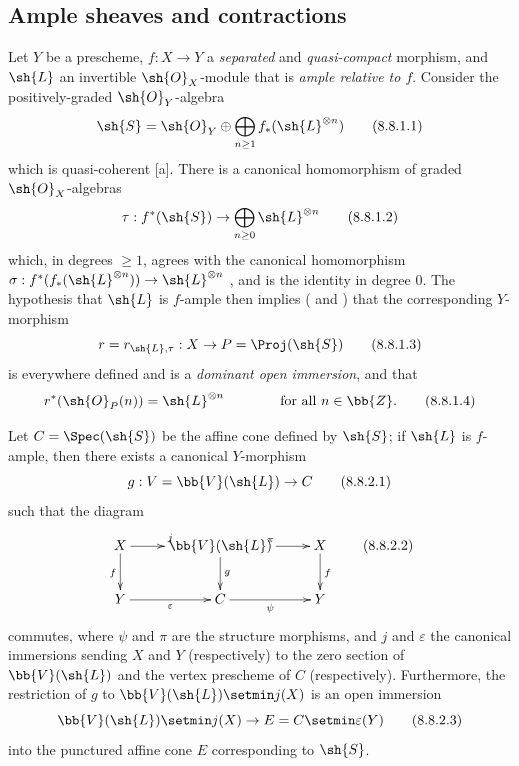 \subsection{Ample sheaves and contractions}
\label{subsection:II.8.8}

\begin{env}[8.8.1]
\label{II.8.8.1}
Let $Y$ be a prescheme, $f:X\to Y$ a \emph{separated} and \emph{quasi-compact} morphism, and $\sh{L}$ an invertible $\sh{O}_X$-module that is \emph{ample relative to $f$}.
Consider the positively-graded $\sh{O}_Y$-algebra
\[
\label{II.8.8.1.1}
  \sh{S} = \sh{O}_Y \oplus \bigoplus_{n\geq1}f_*(\sh{L}^{\otimes n})
\tag{8.8.1.1}
\]
which is quasi-coherent [a].
There is a canonical homomorphism of graded $\sh{O}_X$-algebras
\[
\label{II.8.8.1.2}
  \tau: f^*(\sh{S}) \to \bigoplus_{n\geq0}\sh{L}^{\otimes n}
\tag{8.8.1.2}
\]
which, in degrees $\geq1$, agrees with the canonical homomorphism $\sigma:f^*(f_*(\sh{L}^{\otimes n})) \to \sh{L}^{\otimes n}$ , and is the identity in degree 0.
The hypothesis that $\sh{L}$ is $f$-ample then implies ( and ) that the corresponding $Y$-morphism
\[
\label{II.8.8.1.3}
  r = r_{\sh{L},\tau} : X \to P = \Proj(\sh{S})
\tag{8.8.1.3}
\]
is everywhere defined and is a \emph{dominant open immersion}, and that
\[
\label{II.8.8.1.4}
  r^*(\sh{O}_P(n)) = \sh{L}^{\otimes n}
  \qquad\qquad
  \mbox{for all $n\in\bb{Z}$.}
\tag{8.8.1.4}
\]
\end{env}

\begin{proposition}[8.8.2]
\label{II.8.8.2}
Let $C=\Spec(\sh{S})$ be the affine cone defined by $\sh{S}$;
if $\sh{L}$ is $f$-ample, then there exists a canonical $Y$-morphism
\[
\label{II.8.8.2.1}
  g : V = \bb{V}(\sh{L}) \to C
\tag{8.8.2.1}
\]
such that the diagram
\[
\label{II.8.8.2.2}
  \xymatrix{
    X
      \ar[r]^{j}
      \ar[d]_{f}
  & \bb{V}(\sh{L})
      \ar[r]^{\pi}
      \ar[d]^{g}
  & X
      \ar[d]^{f}
  \\Y
      \ar[r]_{\varepsilon}
  & C
      \ar[r]_{\psi}
  & Y
  }
  \tag{8.8.2.2}
\]
commutes, where $\psi$ and $\pi$ are the structure morphisms, and $j$ and $\varepsilon$ the canonical immersions sending $X$ and $Y$ (respectively) to the zero section of $\bb{V}(\sh{L})$ and the vertex prescheme of $C$ (respectively).
Furthermore, the restriction of $g$ to $\bb{V}(\sh{L})\setmin j(X)$ is an open immersion
\[
\label{II.8.8.2.3}
  \bb{V}(\sh{L})\setmin j(X)\to E=C\setmin\varepsilon(Y)
  \tag{8.8.2.3}
\]
into the punctured affine cone $E$ corresponding to $\sh{S}$.
\end{proposition}

